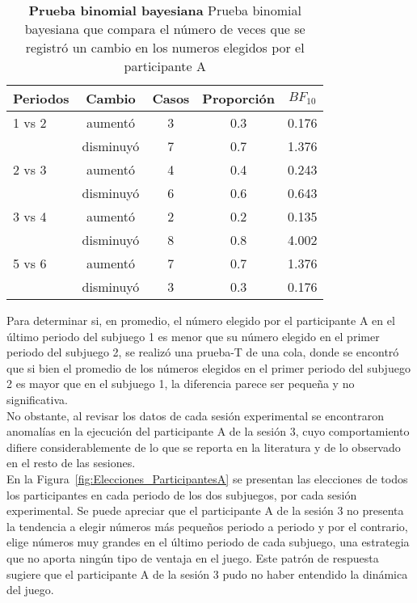 \begin{table}[h]
\caption[Prueba binomial bayesiana para evaluar la proporción de casos en que los participantes A reducen su número elegido]{\textbf{Prueba binomial bayesiana} Prueba binomial bayesiana que compara el número de veces que se registró un cambio en los numeros elegidos por el participante A}
\label{Binom_Reset}
\centering
\begin{tabular}{l c | c c | c}
\toprule
\textbf{Periodos} & \textbf{Cambio} & \textbf{Casos} & \textbf{Proporción} & \textbf{$BF_10$}\\
\midrule
1 vs 2 & aumentó & 3 & 0.3 & 0.176\\
       & disminuyó & 7 & 0.7 & 1.376\\
2 vs 3 & aumentó & 4 & 0.4 & 0.243\\
       & disminuyó & 6 & 0.6 & 0.643\\
3 vs 4 & aumentó & 2 & 0.2 & 0.135\\
       & disminuyó & 8 & 0.8 & 4.002\\
5 vs 6 & aumentó & 7 & 0.7 & 1.376\\
       & disminuyó & 3 & 0.3 & 0.176\\
\bottomrule
\end{tabular}
\end{table}

Para determinar si, en promedio, el número elegido por el participante A en el último periodo del subjuego 1 es menor que su número elegido en el primer periodo del subjuego 2, se realizó una prueba-T de una cola, donde se encontró que si bien el promedio de los números elegidos en el primer periodo del subjuego 2 es mayor que en el subjuego 1, la diferencia parece ser pequeña y no significativa.\\

No obstante, al revisar los datos de cada sesión experimental se encontraron anomalías en la ejecución del participante A de la sesión 3, cuyo comportamiento difiere considerablemente de lo que se reporta en la literatura y de lo observado en el resto de las sesiones.\\

En la Figura~\ref{fig:Elecciones_ParticipantesA} se presentan las elecciones de todos los participantes en cada periodo de los dos subjuegos, por cada sesión experimental. Se puede apreciar que el participante A de la sesión 3 no presenta la tendencia a elegir números más pequeños periodo a periodo y por el contrario, elige números muy grandes en el último periodo de cada subjuego, una estrategia que no aporta ningún tipo de ventaja en el juego. Este patrón de respuesta sugiere que el participante A de la sesión 3 pudo no haber entendido la dinámica del juego.\\

